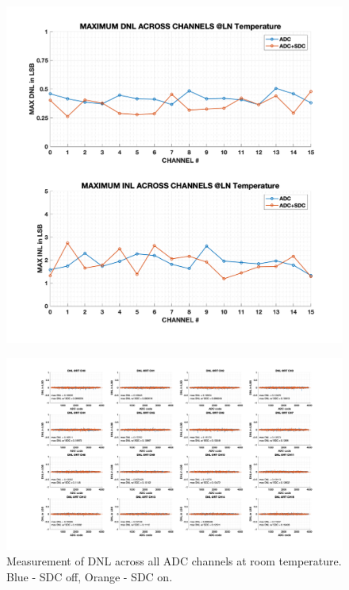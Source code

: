 \begin{figure}[ht!]
\begin{minipage}{.5\textwidth}
  \includegraphics[width=1\linewidth]{figures/sdc_measurements/dnl_inl_ch_all_LN.png}
  \label{fig;sdc;inl_dnl_max_ln}
\end{minipage}
\end{figure}

\begin{figure}[ht!]
  \centering
  \includegraphics[width=1\linewidth]{figures/sdc_measurements/dnl_vs_dnl_sdc_all_ch_RT.png}
  \caption{Measurement of DNL across all ADC channels at room temperature. Blue - SDC off, Orange - SDC on.}
  \label{fig;sdc;dnl_all_rt}
\end{figure}

